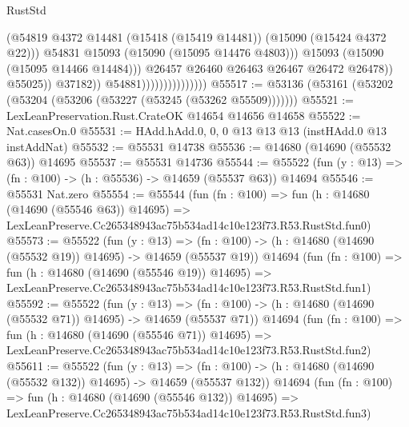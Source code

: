 \begin{lexlean}{RustStd}
\begin{coremodule}
                                                  (@54819
                                                    @4372
                                                    @14481
                                                    (@15418 (@15419 @14481))
                                                    (@15090 (@15424 @4372 @22)))
                                                  @54831
                                                  @15093
                                                  (@15090 (@15095 @14476 @4803)))
                                                @15093
                                                (@15090 (@15095 @14466 @14484)))
                                              @26457
                                              @26460
                                              @26463
                                              @26467
                                              @26472
                                              @26478))
                                          @55025))
                                      @37182))
                                  @54881)))))))))))))))
@55517 := @53136 (@53161 (@53202 (@53204 (@53206 (@53227 (@53245 (@53262 @55509)))))))
@55521 := LexLeanPreservation.Rust.CrateOK @14654 @14656 @14658
@55522 := Nat.casesOn.{0}
@55531 := HAdd.hAdd.{0, 0, 0} @13 @13 @13 (instHAdd.{0} @13 instAddNat)
@55532 := @55531 @14738
@55536 := @14680 (@14690 (@55532 @63)) @14695
@55537 := @55531 @14736
@55544 := @55522 (fun (y : @13) => (fn : @100) -> (h : @55536) -> @14659 (@55537 @63)) @14694
@55546 := @55531 Nat.zero
@55554 := @55544
    (fun (fn : @100) =>
    fun (h : @14680 (@14690 (@55546 @63)) @14695) =>
    LexLeanPreserve.Cc265348943ac75b534ad14c10e123f73.R53.RustStd.fun0)
@55573 := @55522
    (fun (y : @13) =>
    (fn : @100) -> (h : @14680 (@14690 (@55532 @19)) @14695) -> @14659 (@55537 @19))
    @14694
    (fun (fn : @100) =>
    fun (h : @14680 (@14690 (@55546 @19)) @14695) =>
    LexLeanPreserve.Cc265348943ac75b534ad14c10e123f73.R53.RustStd.fun1)
@55592 := @55522
    (fun (y : @13) =>
    (fn : @100) -> (h : @14680 (@14690 (@55532 @71)) @14695) -> @14659 (@55537 @71))
    @14694
    (fun (fn : @100) =>
    fun (h : @14680 (@14690 (@55546 @71)) @14695) =>
    LexLeanPreserve.Cc265348943ac75b534ad14c10e123f73.R53.RustStd.fun2)
@55611 := @55522
    (fun (y : @13) =>
    (fn : @100) -> (h : @14680 (@14690 (@55532 @132)) @14695) -> @14659 (@55537 @132))
    @14694
    (fun (fn : @100) =>
    fun (h : @14680 (@14690 (@55546 @132)) @14695) =>
    LexLeanPreserve.Cc265348943ac75b534ad14c10e123f73.R53.RustStd.fun3)

\end{coremodule}
\end{lexlean}
